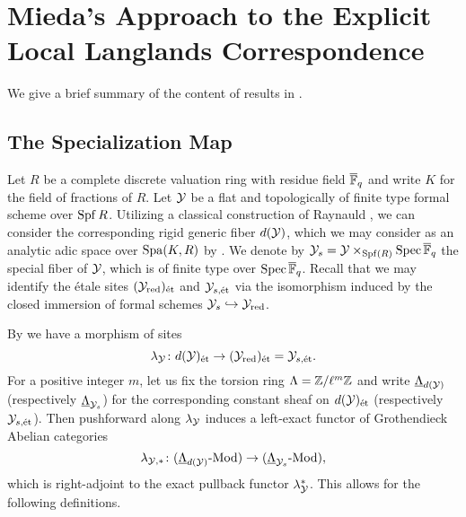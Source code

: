 \documentclass[../main.tex]{subfiles}
\begin{document}
\section{Mieda's Approach to the Explicit Local Langlands Correspondence} %
\label{sec:Mieda's Approach to the Explicit Local Langlands Correspondence}

We give a brief summary of the content of results in \cite{mieda2016geometric}.

\subsection{The Specialization Map} %
\label{sub:The Injectivity FinLevel}
Let $R$ be a complete discrete valuation ring with residue field ${\overline {\mathbb{F}}_q}$ and
write $K$ for the field of fractions of $R$.
Let $\mathcal{Y}$ be a flat and topologically of finite type formal scheme over $\operatorname{Spf} R$.
Utilizing a classical construction of Raynauld \cite{raynaud1974geometrie}, we 
can consider the corresponding rigid generic fiber $d(\mathcal{Y})$, which we may
consider as an analytic adic space over $\operatorname{Spa}(K,R)$ by \cite[Section
1.9]{huber2013etale}. We denote by $\mathcal{Y}_s = \mathcal{Y} \times_{\operatorname{Spf}(R)} \operatorname{Spec}
{\overline {\mathbb{F}}_q}$ the special fiber of $\mathcal{Y}$, which is of finite type over $\operatorname{Spec}
{\overline {\mathbb{F}}_q}$. Recall that we may identify the \'etale sites $(\mathcal{Y}_{\mathrm{red}})_{\textnormal{\'et}}$ and
$\mathcal{Y}_{s,\textnormal{\'et}}$ via the isomorphism induced by the closed immersion of formal schemes
$\mathcal{Y}_s \hookrightarrow \mathcal{Y}_{\mathrm{red}}$.

By \cite[Lemma 3.5.1]{huber2013etale} we have a morphism of sites
\begin{equation*}
  \lambda_{\mathcal{Y}} \colon d(\mathcal{Y})_{\textnormal{\'et}} \to (\mathcal{Y}_{\mathrm{red}})_{\textnormal{\'et}} = \mathcal{Y}_{s, \textnormal{\'et}}.
\end{equation*}
For a positive integer $m$, let us fix the torsion ring $\Lambda = \mathbb{Z}/\ell^m
\mathbb{Z}$ and write $\underline \Lambda_{d(\mathcal{Y})}$ (respectively $\underline
\Lambda_{\mathcal{Y}_{s}}$)
for the corresponding constant sheaf on $d(\mathcal{Y})_{\textnormal{\'et}}$ (respectively $\mathcal{Y}_{s,\textnormal{\'et}}$). Then 
pushforward along $\lambda_{\mathcal{Y}}$ induces a left-exact functor of Grothendieck
Abelian categories
\begin{equation*}
  \lambda_{\mathcal{Y},*}\colon {({\underline \Lambda_{d(\mathcal{Y})}}\text-\allowbreak\mathrm{Mod})} \to {({\underline \Lambda_{\mathcal{Y}_{s}}}\text-\allowbreak\mathrm{Mod})},
\end{equation*}
which is right-adjoint to the exact pullback functor $\lambda_{\mathcal{Y}}^*$.
This allows for the following definitions.
\end{document}
